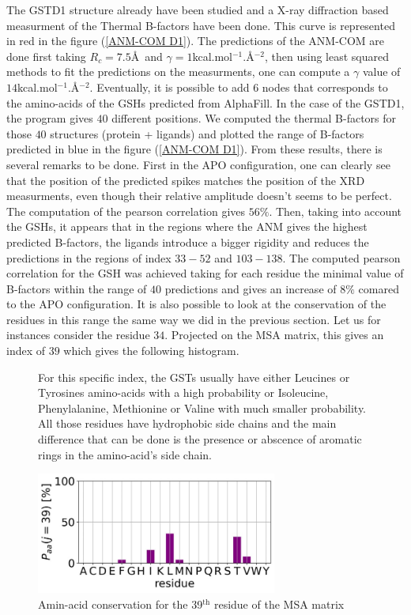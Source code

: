 \noindent The GSTD1 structure already have been studied and a X-ray diffraction based measurment of the Thermal B-factors have been done. This curve is represented in red in the figure (\ref{ANM-COM D1}). The predictions of the ANM-COM are done first taking $R_c = 7.5$\AA ~and $\gamma = 1$kcal.mol$^{-1}$.\AA$^{-2}$, then using least squared methods to fit the predictions on the measurments, one can compute a $\gamma$ value of $14$kcal.mol$^{-1}$.\AA$^{-2}$. Eventually, it is possible to add $6$ nodes that corresponds to the amino-acids of the GSHs predicted from AlphaFill. In the case of the GSTD1, the program gives $40$ different positions. We computed the thermal B-factors for those $40$ structures (protein + ligands) and plotted the range of B-factors predicted in blue in the figure (\ref{ANM-COM D1}). From these results, there is several remarks to be done. First in the APO configuration, one can clearly see that the position of the predicted spikes matches the position of the XRD measurments, even though their relative amplitude doesn't seems to be perfect. The computation of the pearson correlation gives $56\%$. Then, taking into account the GSHs, it appears that in the regions where the ANM gives the highest predicted B-factors, the ligands introduce a bigger rigidity and reduces the predictions in the regions of index $33-52$ and $103-138$. The computed pearson correlation for the GSH was achieved taking for each residue the minimal value of B-factors within the range of $40$ predictions and gives an increase of $8\%$ comared to the APO configuration. It is also possible to look at the conservation of the residues in this range the same way we did in the previous section. Let us for instances consider the residue $34$. Projected on the MSA matrix, this gives an index of $39$ which gives the following histogram.
\begin{figure}[h!]
	\label{j=39}
	\begin{minipage}{.48\linewidth}
		For this specific index, the GSTs usually have either Leucines or Tyrosines amino-acids with a high probability or Isoleucine, Phenylalanine, Methionine or Valine with much smaller probability. All those residues have hydrophobic side chains and the main difference that can be done is the presence or abscence of aromatic rings in the amino-acid's side chain.
	\end{minipage}
	\begin{minipage}{.48\linewidth}
		\centering
		\includegraphics[height = 4cm]{figures/amino-acid_conservation_j=39.jpg}
	\end{minipage}	
	\caption{Amin-acid conservation for the 39$^{\text{th}}$ residue of the MSA matrix}
\end{figure}


